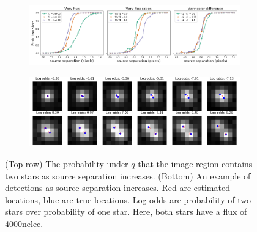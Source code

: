 \begin{figure}[!h]
    \centering
    \begin{subfigure}{0.95\textwidth}
        \includegraphics[width=\textwidth]{figures/deblending_test.png}
    \end{subfigure}
      \begin{subfigure}{0.95\textwidth}
        \includegraphics[width=\textwidth]{figures/deblending_ex.png}
    \end{subfigure}
    \caption{(Top row) The probability under $q$ that the image region contains two stars as source separation increases.
    (Bottom) An example of detections as source separation increases. Red are estimated locations, blue are true locations. Log odds are probability of two stars over probability of one star. Here, both stars have a flux of 4000nelec.}
    \label{fig:deblending_fig}
\end{figure}
